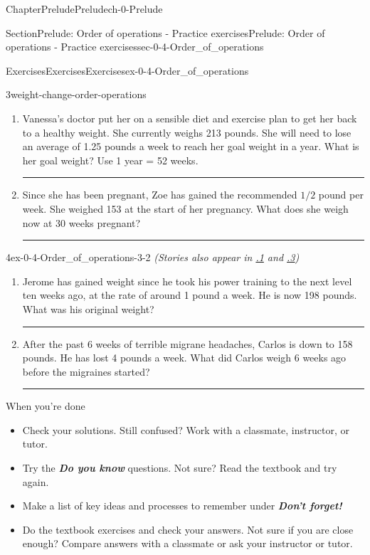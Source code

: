 \documentclass[twoside,11pt,]{book}
\newcommand{\xreffont}{\relax}
\newcommand{\alert}[1]{\textbf{\textit{#1}}}
\newlength{\workspacestrutwidth}
\numberwithin{equation}{section}
\newcommand{\sfrac}[2]{{#1}/{#2}}
\begin{document}
\begin{chapterptx}{Chapter}{Prelude}{}{Prelude}{}{}{ch-0-Prelude}
\begin{sectionptx}{Section}{Prelude: Order of operations - Practice exercises}{}{Prelude: Order of operations - Practice exercises}{}{}{sec-0-4-Order_of_operations}
\begin{exercises-subsection-numberless}{Exercises}{Exercises}{}{Exercises}{}{}{ex-0-4-Order_of_operations}
\begin{divisionexercise}{3}{}{}{weight-change-order-operations}
\begin{enumerate}[label=(\alph*),ref=\alph*]
\item{}Vanessa's doctor put her on a sensible diet and exercise plan to get her back to a healthy weight. She currently weighs 213 pounds. She will need to lose an average of 1.25 pounds a week to reach her goal weight in a year. What is her goal weight? Use 1 year = 52 weeks.%
\par\rule{\workspacestrutwidth}{1.25in}%
\item{}Since she has been pregnant, Zoe has gained the recommended \(\sfrac{1}{2}\) pound per week. She weighed 153 at the start of her pregnancy. What does she weigh now at 30 weeks pregnant?%
\par\rule{\workspacestrutwidth}{1.25in}%
\end{enumerate}%
\end{divisionexercise}%
 \begin{divisionexercise}{4}{}{}{ex-0-4-Order_of_operations-3-2}%
\emph{(Stories also appear in \hyperlink{weight-change-algebraic-notation}{{\xreffont 0.7.1}} and \hyperlink{weight-change-intercepts}{{\xreffont 4.3.3}})}%
\begin{enumerate}[label=(\alph*),ref=\alph*]%
\item{}Jerome has gained weight since he took his power training to the next level ten weeks ago, at the rate of around 1 pound a week. He is now 198 pounds. What was his original weight?%
\par\rule{\workspacestrutwidth}{1.25in}%
\item{}After the past 6 weeks of terrible migrane headaches, Carlos is down to 158 pounds. He has lost 4 pounds a week. What did Carlos weigh 6 weeks ago before the migraines started?%
\par\rule{\workspacestrutwidth}{1in}%
\end{enumerate}%
\end{divisionexercise}%
\end{exercises-subsection-numberless}
\begin{conclusion}{When you're done \textellipsis{}}%
%
\begin{itemize}[label=\textbullet]
\item{}Check your solutions. Still confused? Work with a classmate, instructor, or tutor.%
\item{}Try the \alert{Do you know} questions. Not sure? Read the textbook and try again.%
\item{}Make a list of key ideas and processes to remember under \alert{Don't forget!}%
\item{}Do the textbook exercises and check your answers. Not sure if you are close enough? Compare answers with a classmate or ask your instructor or tutor.%

\end{itemize}
\end{conclusion}
\end{sectionptx}
\end{chapterptx}
\end{document}
